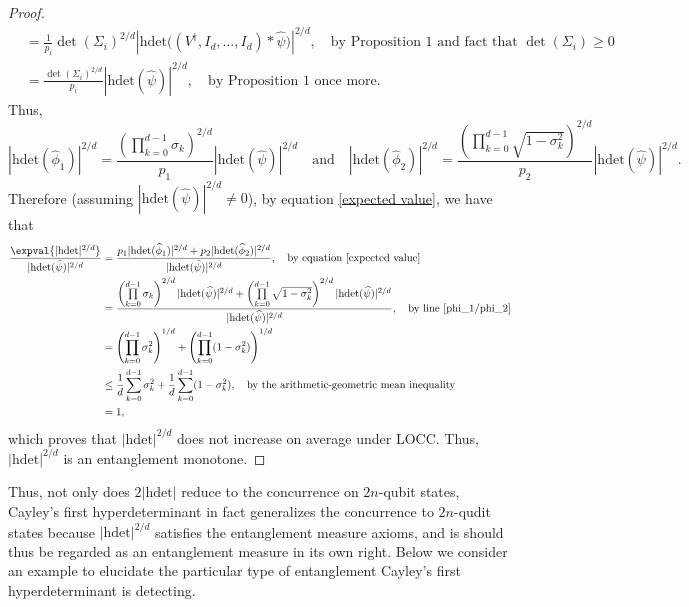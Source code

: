 \documentclass{article}
\begin{document}
\begin{proof}
\begin{align*}
        &= \frac{1}{p_i}\det(\Sigma_i)^{2/d}\left|\mathrm{hdet}\big((V^{\dagger},I_d,...,I_d)*\widehat{\psi}\big)\right|^{2/d},\quad \text{by Proposition 1 and fact that }\det(\Sigma_i)\geq 0 \\
        &= \frac{\det(\Sigma_i)^{2/d}}{p_i}|\mathrm{hdet}(\widehat{\psi})|^{2/d},\quad \text{by Proposition 1 once more.} 
    \end{align*}
    Thus,
    \begin{equation}\label{phi_1/phi_2}
        |\mathrm{hdet}(\widehat{\phi}_1)|^{2/d} = \frac{\left(\prod\limits_{k=0}^{d-1}\sigma_k\right)^{2/d}}{p_1}|\mathrm{hdet}(\widehat{\psi})|^{2/d}\quad\text{and}\quad |\mathrm{hdet}(\widehat{\phi}_2)|^{2/d} = \frac{\left(\prod\limits_{k=0}^{d-1}\sqrt{1-\sigma_k^2}\right)^{2/d}}{p_2}|\mathrm{hdet}(\widehat{\psi})|^{2/d}.
    \end{equation}
    Therefore (assuming $|\mathrm{hdet}(\widehat{\psi})|^{2/d}\neq 0$), by equation \eqref{expected value}, we have that 
    \begin{align*}
        \frac{\expval{|\mathrm{hdet}|^{2/d}}}{|\mathrm{hdet}(\widehat{\psi})|^{2/d}} &= \frac{p_1|\mathrm{hdet}(\widehat{\phi}_1)|^{2/d} + p_2|\mathrm{hdet}(\widehat{\phi}_2)|^{2/d}}{|\mathrm{hdet}(\widehat{\psi})|^{2/d}},\quad \text{by equation }\eqref{expected value} \\
        &= \frac{\left(\prod\limits_{k=0}^{d-1}\sigma_k\right)^{2/d}|\mathrm{hdet}(\widehat{\psi})|^{2/d}+\left(\prod\limits_{k=0}^{d-1}\sqrt{1-\sigma_k^2}\right)^{2/d}|\mathrm{hdet}(\widehat{\psi})|^{2/d}}{|\mathrm{hdet}(\widehat{\psi})|^{2/d}},\quad \text{by line }\eqref{phi_1/phi_2} \\
        &= \left(\prod\limits_{k=0}^{d-1}\sigma_k^2\right)^{1/d} + \left(\prod\limits_{k=0}^{d-1}(1-\sigma_k^2)\right)^{1/d} \\
        &\leq \frac{1}{d}\sum\limits_{k=0}^{d-1}\sigma_k^2+\frac{1}{d}\sum\limits_{k=0}^{d-1}(1-\sigma_k^2),\quad \text{by the arithmetic-geometric mean inequality} \\
        &= 1,
    \end{align*}
    which proves that $|\mathrm{hdet}|^{2/d}$ does not increase on average under LOCC. Thus, $|\mathrm{hdet}|^{2/d}$ is an entanglement monotone. 
\end{proof}
Thus, not only does $2|\mathrm{hdet}|$ reduce to the concurrence on $2n$-qubit states, Cayley's first hyperdeterminant in fact generalizes the concurrence to $2n$-qudit states because $|\mathrm{hdet}|^{2/d}$ satisfies the entanglement measure axioms, and is should thus be regarded as an entanglement measure in its own right. Below we consider an example to elucidate the particular type of entanglement Cayley's first hyperdeterminant is detecting. 
\end{document}
